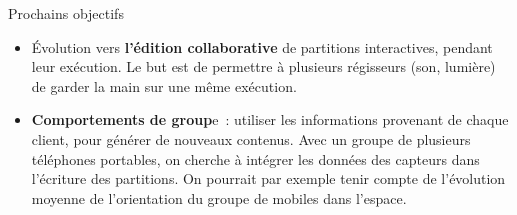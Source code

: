 \begin{block}{Prochains objectifs}
	\begin{itemize}
		\item Évolution vers \textbf{l'édition collaborative} de partitions interactives, pendant leur exécution.
         Le but est de permettre à plusieurs régisseurs (son, lumière) de garder la main sur une même exécution.
		\item \textbf{Comportements de group}e~: utiliser les informations provenant de chaque client, pour générer de nouveaux contenus. 
        Avec un groupe de plusieurs téléphones portables, on cherche à intégrer les données des capteurs dans l'écriture des partitions. On pourrait par exemple tenir compte de l'évolution moyenne de l'orientation du groupe de mobiles dans l'espace.
	\end{itemize}
\end{block}
